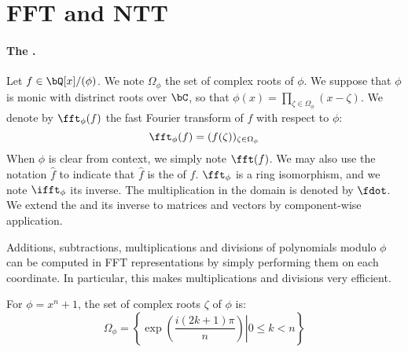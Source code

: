 
\section{FFT and NTT} \label{sec:spec:fftntt}


\paragraph{The \fft.} Let $f \in \bQ[x]/(\phi)$. We note $\Omega_\phi$ the set of complex roots of $\phi$. We suppose that $\phi$ is monic with distrinct roots over $\bC$, so that $\phi(x) = \prod\limits_{\zeta \in \Omega_\phi} (x - \zeta)$. We denote by $\fft_\phi(f)$ the fast Fourier transform of $f$ with respect to $\phi$:
\begin{equation}
 \fft_\phi(f) = (f(\zeta))_{\zeta \in \Omega_\phi}
\end{equation}
When $\phi$ is clear from context, we simply note $\fft(f)$. We may also use the notation $\hat f$ to indicate that $\hat f$ is the \fft of $f$. $\fft_\phi$ is a ring isomorphism, and we note $\ifft_\phi$ its inverse. The multiplication in the \fft domain is denoted by $\fdot$. We extend the \fft and its inverse to matrices and vectors by component-wise application.

Additions, subtractions, multiplications and divisions of polynomials
modulo $\phi$ can be computed in FFT representations by simply
performing them on each coordinate. In particular, this makes
multiplications and divisions very efficient.

For $\phi = x^n + 1$, the set of complex roots $\zeta$ of $\phi$ is:
\begin{equation}\label{eq:phi}
\Omega_\phi = \left\{\left. \exp\left(\frac{i (2k+1)\pi}{n}\right) \right| 0 \leq k < n \right\}
\end{equation}



